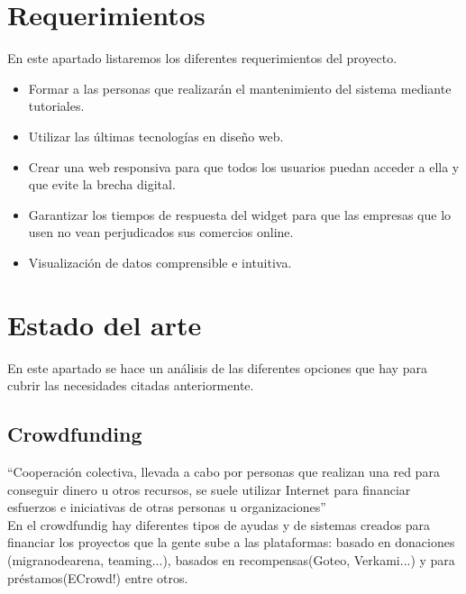 \section{Requerimientos}

En este apartado listaremos los diferentes requerimientos del proyecto.

\begin{itemize}
	\item Formar a las personas que realizarán el mantenimiento del sistema mediante tutoriales.
	\item Utilizar las últimas tecnologías en diseño web.
	\item Crear una web responsiva para que todos los usuarios puedan acceder a ella y que evite la brecha digital.
	\item Garantizar los tiempos de respuesta del widget para que las empresas que lo usen no vean perjudicados sus comercios online.
	\item Visualización de datos comprensible e intuitiva.
\end{itemize}

\section{Estado del arte}
En este apartado se hace un análisis de las diferentes opciones que hay para cubrir las necesidades citadas anteriormente.
\subsection{Crowdfunding}
“Cooperación colectiva, llevada a cabo por personas que realizan una red para conseguir dinero u otros recursos, se suele utilizar Internet para financiar esfuerzos e iniciativas de otras personas u organizaciones”\cite{crowd}\\

En el crowdfundig hay diferentes tipos de ayudas y de sistemas creados para financiar los proyectos que la gente sube a las plataformas: basado en donaciones (migranodearena, teaming...), basados en recompensas(Goteo, Verkami...) y para préstamos(ECrowd!) entre otros.

